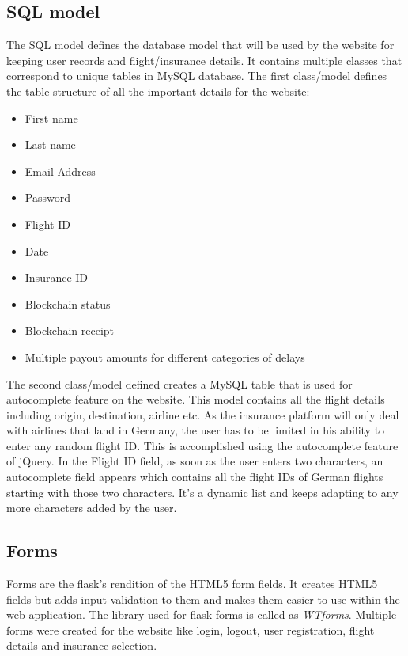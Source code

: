 \subsection{SQL model}
The SQL model defines the database model that will be used by the website for keeping user records and flight/insurance details. It contains multiple classes that correspond to unique tables in MySQL database. The first class/model defines the table structure of all the important details for the website:
\begin{itemize}
    \item First name
    \item Last name
    \item Email Address
    \item Password
    \item Flight ID
    \item Date
    \item Insurance ID
    \item Blockchain status
    \item Blockchain receipt
    \item Multiple payout amounts for different categories of delays
\end{itemize}

The second class/model defined creates a MySQL table that is used for autocomplete feature on the website. This model contains all the flight details including origin, destination, airline etc. As the insurance platform will only deal with airlines that land in Germany, the user has to be limited in his ability to enter any random flight ID. This is accomplished using the autocomplete feature of jQuery. In the Flight ID field, as soon as the user enters two characters, an autocomplete field appears which contains all the flight IDs of German flights starting with those two characters. It's a dynamic list and keeps adapting to any more characters added by the user. 

\subsection{Forms}
Forms are the flask's rendition of the HTML5 form fields. It creates HTML5 fields but adds input validation to them and makes them easier to use within the web application. The library used for flask forms is called as \textit{WTforms}. Multiple forms were created for the website like login, logout, user registration, flight details and insurance selection. 

